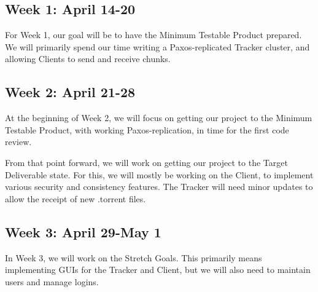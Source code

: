 \documentclass[12pt]{article}
\begin{document}
\subsection*{Week 1: April 14-20}
For Week 1, our goal will be to have the Minimum Testable Product prepared.
We will primarily spend our time writing a Paxos-replicated Tracker cluster,
and allowing Clients to send and receive chunks.

\subsection*{Week 2: April 21-28}
At the beginning of Week 2, we will focus on getting our project to the Minimum
Testable Product, with working Paxos-replication, in time for the first
code review.

From that point forward, we will work on getting our project to the
Target Deliverable state.
For this, we will mostly be working on the Client, to implement various security
and consistency features.
The Tracker will need minor updates to allow the receipt of new .torrent files.

\subsection*{Week 3: April 29-May 1}
In Week 3, we will work on the Stretch Goals.
This primarily means implementing GUIs for the Tracker and Client,
but we will also need to maintain users and manage logins.
\end{document}
